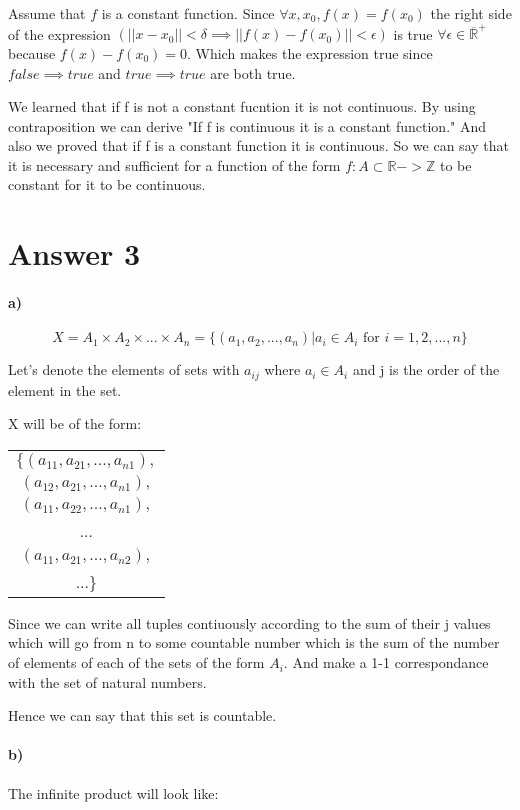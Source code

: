 \documentclass[12pt]{article}
\begin{document}
 Assume that $f$ is a constant function. Since $\forall x,x_0,f(x)=f(x_0)$ the right side of the expression $(||x -x_0|| < \delta \implies ||f(x) -f(x_0)|| < \epsilon)$ is true $\forall \epsilon \in \overline{\mathbb{R}}^{+}$ because $f(x)-f(x_0)=0$. Which makes the expression true since $false\implies true$ and $true\implies true$ are both true.
 
 We learned that if f is not a constant fucntion it is not continuous. By using contraposition we can derive "If f is continuous it is a constant function." And also we proved that if f is a constant function it is continuous. So we can say that it is necessary and sufficient for a function of the form $f : A\subset \mathbb{R} -> \mathbb{Z}$ to be constant for it to be continuous.

\section*{Answer 3}
\paragraph{a)}
$$X=A_1\times A_2 \times ...\times A_n=\{(a_1,a_2,...,a_n)|a_i\in A_i \text{ for } i=1,2,...,n\}$$

Let's denote the elements of sets with $a_{ij}$ where $a_i\in A_i$ and j is the order of the element in the set.

X will be of the form:

\begin{tabular}{c}
$\{(a_{11},a_{21},...,a_{n1}),$\\
 $(a_{12},a_{21},...,a_{n1}),$\\
 $(a_{11},a_{22},...,a_{n1}),$\\
 ...\\
 $(a_{11},a_{21},...,a_{n2}),$\\ 
 ...\}\\


\end{tabular}

Since we can write all tuples contiuously according to the sum of their j values which will go from n to some countable number which is the sum of the number of elements of each of the sets of the form $A_i$. And make a 1-1 correspondance with the set of natural numbers.

Hence we can say that this set is countable.
\paragraph{b)}
The infinite product will look like:
\end{document}

